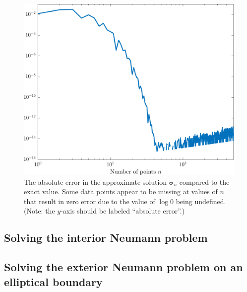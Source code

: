 \documentclass[11pt]{article}
\begin{document}
\begin{figure}[!htb]
  \centering
  \includegraphics[width=0.9\linewidth]{sigma_error.png}
  \caption{The absolute error in the approximate solution $\bm{\sigma}_n$ compared to the exact value. Some data points appear to be missing at values of $n$ that result in zero error due to the value of $\log 0$ being undefined. (Note: the $y$-axis should be labeled ``absolute error''.)}
  \label{fig:sigma_error}
\end{figure}

\subsection{Solving the interior Neumann problem}

\subsection{Solving the exterior Neumann problem on an elliptical boundary}
\end{document}
